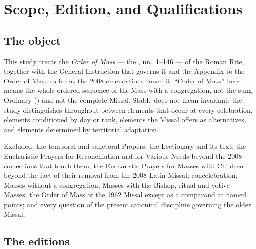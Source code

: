 \section{Scope, Edition, and Qualifications}

\subsection*{The object}

This study treats the \emph{Order of Mass} --- the , nn.\ 1--146 --- of the
Roman Rite, together with the General Instruction that governs it and the Appendix to the Order
of Mass so far as the 2008 emendations touch it. ``Order of Mass'' here means the whole ordered
sequence of the Mass with a congregation, not the sung Ordinary () and not the complete Missal. Stable does not mean invariant: the study
distinguishes throughout between elements that occur at every celebration, elements conditioned
by day or rank, elements the Missal offers as alternatives, and elements determined by
territorial adaptation.

Excluded: the temporal and sanctoral Propers; the Lectionary and its text; the Eucharistic
Prayers for Reconciliation and for Various Needs beyond the 2008 corrections that touch them;
the Eucharistic Prayers for Masses with Children beyond the fact of their removal from the 2008
Latin Missal; concelebration, Masses without a congregation, Masses with the Bishop, ritual and
votive Masses; the Order of Mass of the 1962 Missal except as a comparand at named points; and
every question of the present canonical discipline governing the older Missal.

\subsection*{The editions}

